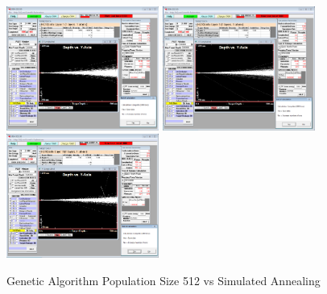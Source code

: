 \begin{figure}[!ht]
  \begin{center}
    \includegraphics[width=5.0cm]{appendix/srim_data/18MeV.png}
    \includegraphics[width=5.0cm]{appendix/srim_data/20MeV.png}
    \includegraphics[width=5.0cm]{appendix/srim_data/22MeV.png}
    \caption{Genetic Algorithm Population Size 512 vs Simulated Annealing}
    \label{fig:ga_vs_sim_512_3}
  \end{center}
\end{figure}

